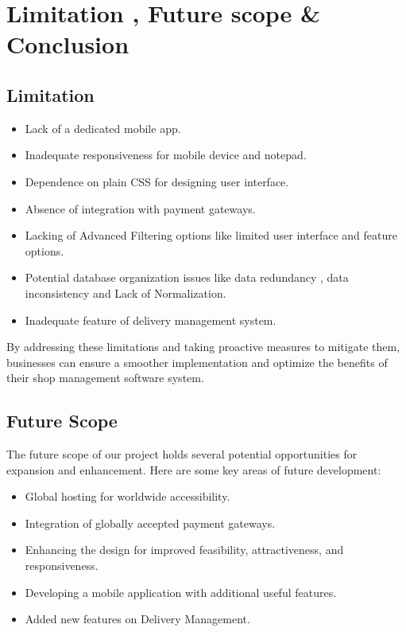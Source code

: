 \chapter{Limitation , Future scope \& Conclusion}
\section{Limitation}
\vspace{0.2cm}
\begin{itemize}
\item Lack of a dedicated mobile app.
\item Inadequate responsiveness for mobile device and notepad.
\item Dependence on plain CSS for designing user interface.
\item Absence of integration with payment gateways.
\item Lacking of Advanced Filtering options like limited user interface and feature options. 
\item Potential database organization issues like data redundancy , data inconsistency and Lack of Normalization.
\item Inadequate feature of delivery management system.
\end{itemize}

By addressing these limitations and taking proactive measures to mitigate them, businesses can ensure a smoother implementation and optimize the benefits of their shop management software system.
\\[1ex]

\section{Future Scope}
\vspace{0.2cm}

The future scope of our project holds several potential opportunities for expansion and enhancement. Here are some key areas of future development:

\begin{itemize}
\item Global hosting for worldwide accessibility.
\item Integration of globally accepted payment gateways.
\item Enhancing the design for improved feasibility, attractiveness, and responsiveness.
\item Developing a mobile application with additional useful features.
\item Added new features on Delivery Management.
\end{itemize}

